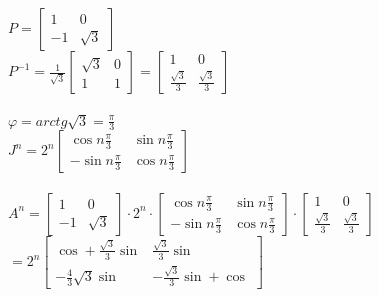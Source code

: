 \\\\
$P=\left[ \begin{array}{cc}    1&0\\-1&\sqrt{3}   \end{array}\right]$\\
$P^{-1}=\frac{1}{\sqrt{3}}\left[ \begin{array}{cc}    \sqrt{3}&0\\1&1   \end{array}\right]=\left[ \begin{array}{cc}   1&0\\ \frac{\sqrt{3}}{3}&\frac{\sqrt{3}}{3} \end{array}\right]$\\
\\
$\varphi=arctg \sqrt{3}=\frac{\pi}{3}$\\
$J^n=2^n\left[ \begin{array}{cc}     \cos n\frac{\pi}{3}&\sin n \frac{\pi}{3}\\-\sin n \frac{\pi}{3}&\cos n \frac{\pi}{3}    \end{array}\right]$\\
\\
$A^n=\left[ \begin{array}{cc}    1&0\\-1&\sqrt{3}   \end{array}\right]\cdot 2^n \cdot \left[ \begin{array}{cc}     \cos n\frac{\pi}{3}&\sin n \frac{\pi}{3}\\-\sin n \frac{\pi}{3}&\cos n \frac{\pi}{3}    \end{array}\right] \cdot \left[ \begin{array}{cc}   1&0\\ \frac{\sqrt{3}}{3}&\frac{\sqrt{3}}{3} \end{array}\right]$\\
$=2^n \left[ \begin{array}{cc}
	\cos+\frac{\sqrt{3}}{3}\sin   &  \frac{\sqrt{3}}{3} \sin \\
	-\frac{4}{3} \sqrt{3} \sin       &   -\frac{\sqrt{3}}{3} \sin + \cos
 \end{array}\right]$\\

